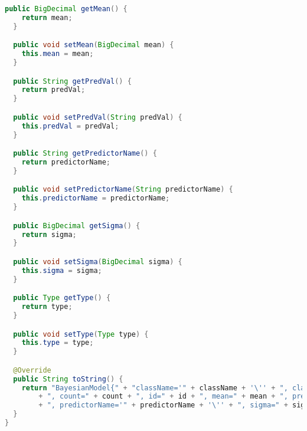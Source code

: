 \begin{lstlisting}[language=Java,basicstyle=\tiny,caption=BayesianModel.java]
  public BigDecimal getMean() {
    return mean;
  }

  public void setMean(BigDecimal mean) {
    this.mean = mean;
  }

  public String getPredVal() {
    return predVal;
  }

  public void setPredVal(String predVal) {
    this.predVal = predVal;
  }

  public String getPredictorName() {
    return predictorName;
  }

  public void setPredictorName(String predictorName) {
    this.predictorName = predictorName;
  }

  public BigDecimal getSigma() {
    return sigma;
  }

  public void setSigma(BigDecimal sigma) {
    this.sigma = sigma;
  }

  public Type getType() {
    return type;
  }

  public void setType(Type type) {
    this.type = type;
  }

  @Override
  public String toString() {
    return "BayesianModel{" + "className='" + className + '\'' + ", classVal='" + classVal + '\''
        + ", count=" + count + ", id=" + id + ", mean=" + mean + ", predVal='" + predVal + '\''
        + ", predictorName='" + predictorName + '\'' + ", sigma=" + sigma + ", type=" + type + '}';
  }
}

\end{lstlisting}


